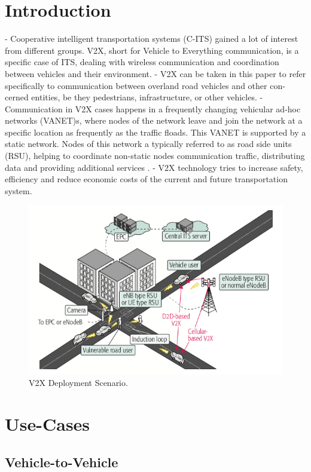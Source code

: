 \documentclass[conference,12pt,onecolumn]{IEEEtran}
\begin{document}
\section{Introduction}
- Cooperative intelligent transportation systems (C-ITS) gained a lot of interest from different groups. V2X, short for Vehicle to Everything communication, is a specific case of ITS, dealing with wireless communication and coordination between vehicles and their environment.
- V2X can be taken in this paper to refer specifically to communication between overland road vehicles and other con- cerned entities, be they pedestrians, infrastructure, or other vehicles. \cite{machardy2018}
- Communication in V2X cases happens in a frequently changing vehicular ad-hoc networks (VANET)s, where nodes of the network leave and join the network at a specific location as frequently as the traffic floads. This VANET is supported by a static network. Nodes of this network a typically referred to as road side units (RSU), helping to coordinate non-static nodes communication traffic, distributing data and providing additional services \cite{machardy2018}.
- V2X technology tries to increase safety, efficiency and reduce economic costs of the current and future transportation system. \cite{machardy2018}

\begin{figure} [ht]
   \centering
   \includegraphics[width=0.7\linewidth]{_Graphics/v2x_deployment_example.png}
  \caption{V2X Deployment Scenario. \cite{seo2016}}
  \label{fig:v2x_deployment_example}
\end{figure}

\section{Use-Cases}
\subsection{Vehicle-to-Vehicle}
\end{document}
